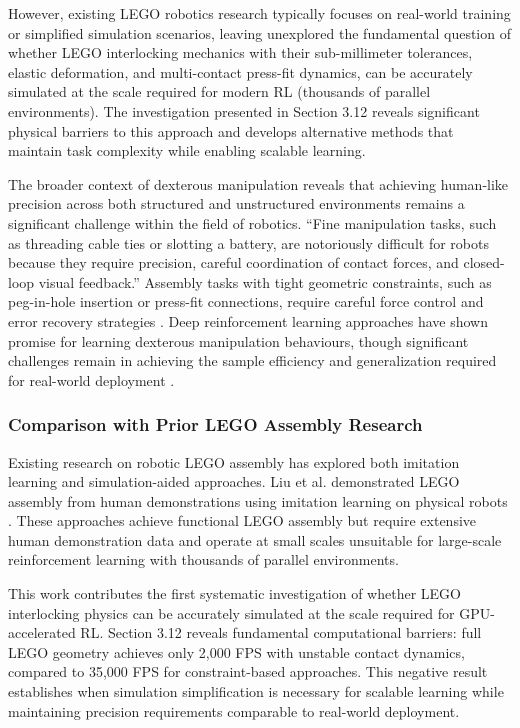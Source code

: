 \documentclass[12pt,a4paper,oneside]{report}
\begin{document}
However, existing LEGO robotics research typically focuses on real-world training or simplified simulation scenarios, leaving unexplored the fundamental question of whether LEGO interlocking mechanics with their sub-millimeter tolerances, elastic deformation, and multi-contact press-fit dynamics, can be accurately simulated at the scale required for modern RL (thousands of parallel environments). The investigation presented in Section 3.12 reveals significant physical barriers to this approach and develops alternative methods that maintain task complexity while enabling scalable learning.

The broader context of dexterous manipulation reveals that achieving human-like precision across both structured and unstructured environments remains a significant challenge within the field of robotics. ``Fine manipulation tasks, such as threading cable ties or slotting a battery, are notoriously difficult for robots because they require precision, careful coordination of contact forces, and closed-loop visual feedback.'' \cite{zhaoLearningFinegrainedBimanual2023} Assembly tasks with tight geometric constraints, such as peg-in-hole insertion or press-fit connections, require careful force control and error recovery strategies \cite{zhaoLearningFinegrainedBimanual2023}. Deep reinforcement learning approaches have shown promise for learning dexterous manipulation behaviours, though significant challenges remain in achieving the sample efficiency and generalization required for real-world deployment \cite{chenDexterousManipulationMultiFingered2022, ibarzHowTrainYour2021}.

\subsubsection{Comparison with Prior LEGO Assembly Research}

Existing research on robotic LEGO assembly has explored both imitation learning and simulation-aided approaches. Liu et al. demonstrated LEGO assembly from human demonstrations using imitation learning on physical robots \cite{liuRoboticLEGOAssembly2023, liuSimulationaidedLearningDemonstration2023}. These approaches achieve functional LEGO assembly but require extensive human demonstration data and operate at small scales unsuitable for large-scale reinforcement learning with thousands of parallel environments.

This work contributes the first systematic investigation of whether LEGO interlocking physics can be accurately simulated at the scale required for GPU-accelerated RL. Section 3.12 reveals fundamental computational barriers: full LEGO geometry achieves only 2,000 FPS with unstable contact dynamics, compared to 35,000 FPS for constraint-based approaches. This negative result establishes when simulation simplification is necessary for scalable learning while maintaining precision requirements comparable to real-world deployment.
\end{document}
